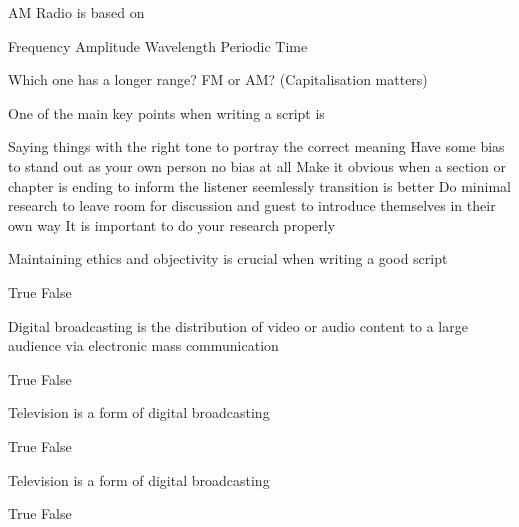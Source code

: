 \documentclass[theme=sleek, randomorder, hidesidemenu]{webquiz}
\begin{document}
\begin{question}
  AM Radio is based on
  \begin{choice}
    \incorrect Frequency
    \correct Amplitude
    \incorrect Wavelength
    \incorrect Periodic Time
  \end{choice}
\end{question}

\begin{question}
  Which one has a longer range? FM or AM? (Capitalisation matters)
\end{question}

\begin{question}
  One of the main key points when writing a script is
  \begin{choice}
    \correct Saying things with the right tone to portray the correct meaning
    \incorrect Have some bias to stand out as your own person
    \feedback no bias at all
    \incorrect Make it obvious when a section or chapter is ending to inform the listener
    \feedback seemlessly transition is better
    \incorrect Do minimal research to leave room for discussion and guest to introduce themselves in their own way
    \feedback It is important to do your research properly
  \end{choice}
\end{question}

\begin{question}
    Maintaining ethics and objectivity is crucial when writing a good script
  \begin{choice}
    \correct True
    \incorrect False
  \end{choice}
\end{question}

\begin{question}
    Digital broadcasting is the distribution of video or audio content to a large audience via electronic mass communication
  \begin{choice}
    \correct True
    \incorrect False
  \end{choice}
\end{question}

\begin{question}
  Television is a form of digital broadcasting
  \begin{choice}
    \correct True
    \incorrect False
  \end{choice}
\end{question}

\begin{question}
  Television is a form of digital broadcasting
  \begin{choice}
    \correct True
    \incorrect False
  \end{choice}
\end{question}
\end{document}
